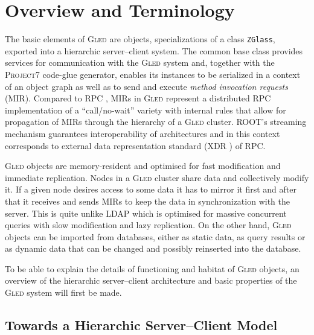 \documentclass[final]{siamltex}
\def\gled{\textsc{Gled}\xspace}
\def\p7{\textsc{Project7}\xspace}
\def\smalltt#1{{\small\texttt{#1}}}
\begin{document}
\section{Overview and Terminology}

The basic elements of \gled are objects, specializations of a class
\smalltt{ZGlass}, exported into a hierarchic server--client system.
The common base class provides services for communication with the
\gled system and, together with the \p7 code-glue generator, enables
its instances to be serialized in a context of an object graph as well
as to send and execute \emph{method invocation requests} (MIR).
Compared to RPC \cite{rpc}, MIRs in \gled represent a distributed RPC
implementation of a ``call/no-wait'' variety with internal rules that
allow for propagation of MIRs through the hierarchy of a \gled
cluster. ROOT's streaming mechanism guarantees interoperability of
architectures and in this context corresponds to external data
representation standard (XDR \cite{xdr}) of RPC.

\gled objects are memory-resident and optimised for fast modification
and immediate replication. Nodes in a \gled cluster share data and
collectively modify it. If a given node desires access to some data it
has to mirror it first and after that it receives and sends MIRs to
keep the data in synchronization with the server. This is quite unlike
LDAP \cite{ldap} which is optimised for massive concurrent queries
with slow modification and lazy replication. On the other hand, \gled
objects can be imported from databases, either as static data, as
query results or as dynamic data that can be changed and possibly
reinserted into the database.

To be able to explain the details of functioning and habitat of \gled
objects, an overview of the hierarchic server--client architecture and
basic properties of the \gled system will first be made.


\subsection{Towards a Hierarchic Server--Client Model}
\end{document}

